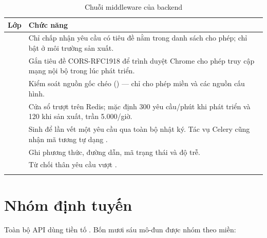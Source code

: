 \begin{center}
\end{center}

\begin{longtable}{L{4.6cm} L{9.0cm}}
\toprule
\textbf{Lớp} & \textbf{Chức năng}\\
\midrule
\endhead
{} & Chỉ chấp nhận yêu cầu có tiêu đề  nằm trong danh sách cho phép; chỉ bật ở môi trường sản xuất.\\
 & Gắn tiêu đề CORS-RFC1918 để trình duyệt Chrome cho phép truy cập mạng nội bộ trong lúc phát triển.\\
 & Kiểm soát nguồn gốc chéo () — chỉ cho phép miền  và các nguồn cấu hình.\\
 & Cửa sổ trượt trên Redis; mặc định 300 yêu cầu/phút khi phát triển và 120 khi sản xuất, trần 5.000/giờ.\\
 & Sinh  để lần vết một yêu cầu qua toàn bộ nhật ký. Tác vụ Celery cũng nhận mã tương tự dạng .\\
 & Ghi phương thức, đường dẫn, mã trạng thái và độ trễ.\\
 & Từ chối thân yêu cầu vượt .\\
\bottomrule
\caption{Chuỗi middleware của backend}
\end{longtable}

\section{Nhóm định tuyến}

Toàn bộ API dùng tiền tố . Bốn mươi sáu mô-đun được nhóm theo miền:

